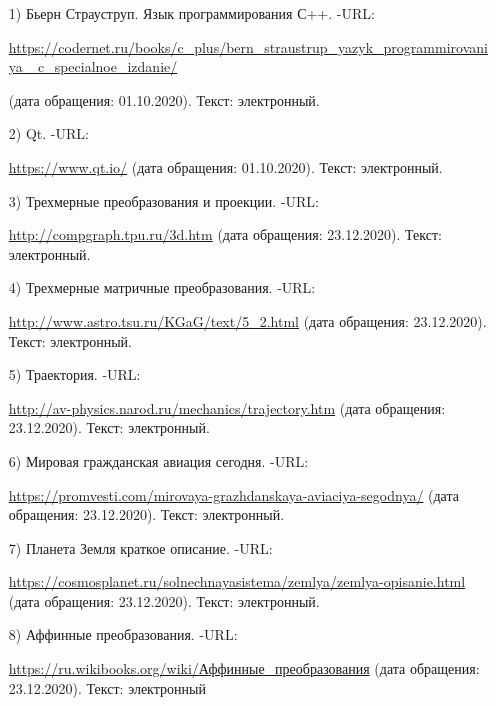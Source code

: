 \documentclass[14pt, a4paper]{extarticle}
\begin{document}
	\begin{enumerate}
		\label{CPlusPlus}
		\item[1)] Бьерн Страуструп. Язык программирования С++. -URL:\par 
		\href{https://codernet.ru/books/c_plus/bern_straustrup_yazyk_programmirovaniya_c_specialnoe_izdanie/}
		{https://codernet.ru/books/c\_plus/bern\_straustrup\_yazyk\_programmirovaniya\_
			c\_specialnoe\_izdanie/}\par(дата обращения:
		01.10.2020). Текст: электронный.
		
		\label{Cute}
		\item[2)] Qt. -URL:\par
		\href{https://www.qt.io/}{https://www.qt.io/} (дата обращения: 01.10.2020). Текст: электронный.
		
		\item[3)] Трехмерные преобразования и проекции. -URL:\par
		\href{http://compgraph.tpu.ru/3d.htm}{http://compgraph.tpu.ru/3d.htm} (дата обращения: 23.12.2020). Текст: электронный.
		
		\item[4)] Трехмерные матричные преобразования. -URL:\par
		\href{http://www.astro.tsu.ru/KGaG/text/5_2.html}{http://www.astro.tsu.ru/KGaG/text/5\_2.html} (дата обращения: 23.12.2020). Текст: электронный.
		
		\item[5)] Траектория. -URL:\par
		\href{http://av-physics.narod.ru/mechanics/trajectory.htm}{http://av-physics.narod.ru/mechanics/trajectory.htm} (дата обращения: 23.12.2020). Текст: электронный.
		
		\item[6)] Мировая гражданская авиация сегодня. -URL:\par
		\href{https://promvesti.com/mirovaya-grazhdanskaya-aviaciya-segodnya/}{https://promvesti.com/mirovaya-grazhdanskaya-aviaciya-segodnya/} (дата обращения: 23.12.2020). Текст: электронный.
		
		\item[7)] Планета Земля краткое описание. -URL:\par
		\href{https://cosmosplanet.ru/solnechnayasistema/zemlya/zemlya-opisanie.html}{https://cosmosplanet.ru/solnechnayasistema/zemlya/zemlya-opisanie.html} (дата обращения: 23.12.2020). Текст: электронный.
		
		\newpage
		\item[8)] Аффинные преобразования. -URL:\par
		\href{https://ru.wikibooks.org/wiki/Аффинные_преобразования}{https://ru.wikibooks.org/wiki/Аффинные\_преобразования} (дата обращения: 23.12.2020). Текст: электронный		
		

\end{enumerate}
\end{document}
